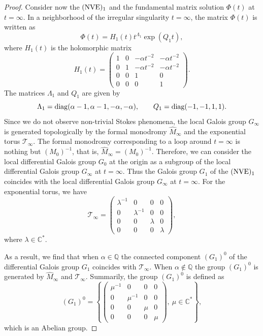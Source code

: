\documentclass[10pt,a4paper]{article}
\numberwithin{equation}{section}
\begin{document}
\begin{proof}
 Consider now the $({\rm NVE})_1$ and the fundamental matrix solution $\Phi(t)$ at $t=\infty$. In a neighborhood of the irregular singularity $t=\infty$, the matrix $\Phi(t)$ is written
 as
 \[
 \Phi(t)=H_1(t) t^{\Lambda_1} \exp (Q_1 t) ,
 \]
 where $H_1(t)$ is the holomorphic matrix
 \[
 H_1(t)=\begin{pmatrix}
 1 & 0 & -\alpha t^{-2} & -\alpha t^{-2}\\
 0 & 1 & -\alpha t^{-2} & -\alpha t^{-2}\\
 0 & 0 & 1 & 0\\
 0 & 0 & 0 & 1
 \end{pmatrix} .
 \]
 The matrices $\Lambda_1$ and $Q_1$ are given by
 \[
 \Lambda_1={\rm diag} (\alpha-1, \alpha-1, -\alpha, -\alpha),\qquad
 Q_1={\rm diag}(-1, -1, 1, 1) .
 \]
 Since we do not observe non-trivial Stokes phenomena, the local Galois group $G_{\infty}$ is generated topologically by the formal monodromy $\hat{M}_{\infty}$ and the
 exponential torus $\mathcal{T}_{\infty}$. The formal monodromy corresponding to a loop around $t=\infty$ is nothing but $(M_0)^{-1}$, that is, $\hat{M}_{\infty}=(M_0)^{-1}$. Therefore, we can consider
 the local differential Galois group $G_0$ at the origin as a subgroup of the local differential Galois group $G_{\infty}$ at $t=\infty$. Thus the Galois group $G_1$ of the $({\rm NVE})_1$
 coincides with the local differential Galois group $G_{\infty}$ at $t=\infty$. For the exponential torus, we have
 \[
 \mathcal{T}_{\infty}=\begin{pmatrix}
 \lambda^{-1} & 0 & 0 & 0\\
 0 & \lambda^{-1} & 0 & 0\\
 0 & 0 & \lambda & 0\\
 0 & 0 & 0 & \lambda
 \end{pmatrix} ,
 \]
 where $\lambda\in\mathbb{C}^*$.

 As a result, we find that when $\alpha\in\mathbb{Q}$ the connected component $(G_1)^0$ of the differential Galois group $G_1$ coincides with $\mathcal{T}_{\infty}$. When $\alpha\notin\mathbb{Q}$ the group
 $(G_1)^0$ is generated by $\hat{M}_{\infty}$ and $\mathcal{T}_{\infty}$. Summarily, the group $(G_1)^0$ is defined as
 \[
 (G_1)^0=\left\{\begin{pmatrix}
 \mu^{-1} & 0 & 0 & 0\\
 0 & \mu^{-1} & 0 & 0\\
 0 & 0 & \mu & 0\\
 0 & 0 & 0 & \mu
 \end{pmatrix}, \ \mu\in\mathbb{C}^*\right\} ,
 \]
 which is an Abelian group.
 \end{proof}
\end{document}
